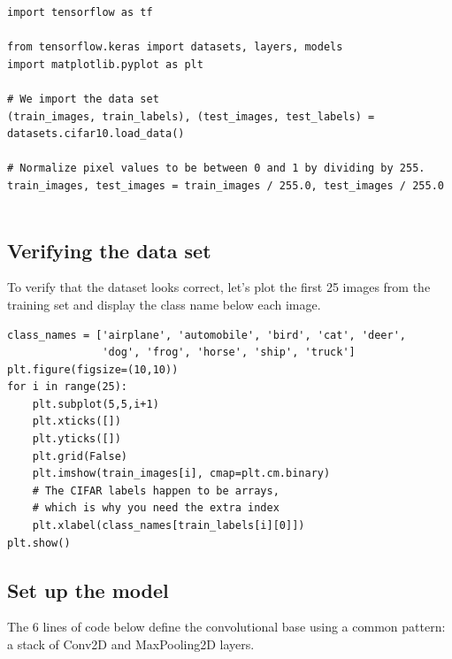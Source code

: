 \documentclass[%
oneside,                 %
final,                   %
10pt]{article}
\begin{document}
\begin{verbatim}
import tensorflow as tf

from tensorflow.keras import datasets, layers, models
import matplotlib.pyplot as plt

# We import the data set
(train_images, train_labels), (test_images, test_labels) = datasets.cifar10.load_data()

# Normalize pixel values to be between 0 and 1 by dividing by 255. 
train_images, test_images = train_images / 255.0, test_images / 255.0


\end{verbatim}


\subsection{Verifying the data set}

To verify that the dataset looks correct, let's plot the first 25 images from the training set and display the class name below each image.















\begin{verbatim}
class_names = ['airplane', 'automobile', 'bird', 'cat', 'deer',
               'dog', 'frog', 'horse', 'ship', 'truck']
plt.figure(figsize=(10,10))
for i in range(25):
    plt.subplot(5,5,i+1)
    plt.xticks([])
    plt.yticks([])
    plt.grid(False)
    plt.imshow(train_images[i], cmap=plt.cm.binary)
    # The CIFAR labels happen to be arrays, 
    # which is why you need the extra index
    plt.xlabel(class_names[train_labels[i][0]])
plt.show()

\end{verbatim}


\subsection{Set up  the model}

The 6 lines of code below define the convolutional base using a common pattern: a stack of Conv2D and MaxPooling2D layers.
\end{document}
